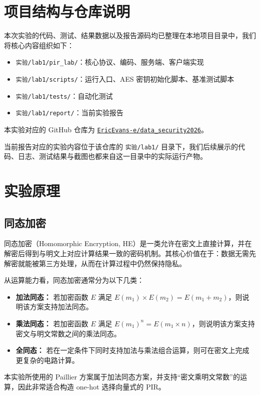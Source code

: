 \documentclass[UTF8,a4paper,10pt]{ctexart}
\begin{document}
\section{项目结构与仓库说明}
本次实验的代码、测试、结果数据以及报告源码均已整理在本地项目目录中，我们将核心内容组织如下：
\begin{itemize}
    \item \texttt{实验/lab1/pir\_lab/}：核心协议、编码、服务端、客户端实现
    \item \texttt{实验/lab1/scripts/}：运行入口、AES 密钥初始化脚本、基准测试脚本
    \item \texttt{实验/lab1/tests/}：自动化测试
    \item \texttt{实验/lab1/report/}：当前实验报告
\end{itemize}

本实验对应的 GitHub 仓库为 \href{https://github.com/EricEvans-e/data_security2026}{\texttt{EricEvans-e/data\_security2026}}。

当前报告对应的实验内容位于该仓库的 \texttt{实验/lab1/} 目录下，我们后续展示的代码、日志、测试结果与截图也都来自这一目录中的实际运行产物。

\section{实验原理}

\subsection{同态加密}
同态加密（Homomorphic Encryption, HE）是一类允许在密文上直接计算，并在解密后得到与明文上对应计算结果一致的密码机制。其核心价值在于：数据无需先解密就能被第三方处理，从而在计算过程中仍然保持隐私。

从运算能力看，同态加密通常分为以下几类：
\begin{itemize}
    \item \textbf{加法同态：} 若加密函数 $E$ 满足 $E(m_1)\times E(m_2)=E(m_1+m_2)$，则说明该方案支持加法同态。
    \item \textbf{乘法同态：} 若加密函数 $E$ 满足 $E(m_1)^n=E(m_1\times n)$，则说明该方案支持密文与明文常数之间的乘法同态。
    \item \textbf{全同态：} 若在一定条件下同时支持加法与乘法组合运算，则可在密文上完成更复杂的电路计算。
\end{itemize}

本实验所使用的 Paillier 方案属于加法同态方案，并支持“密文乘明文常数”的运算，因此非常适合构造 one-hot 选择向量式的 PIR。
\end{document}
